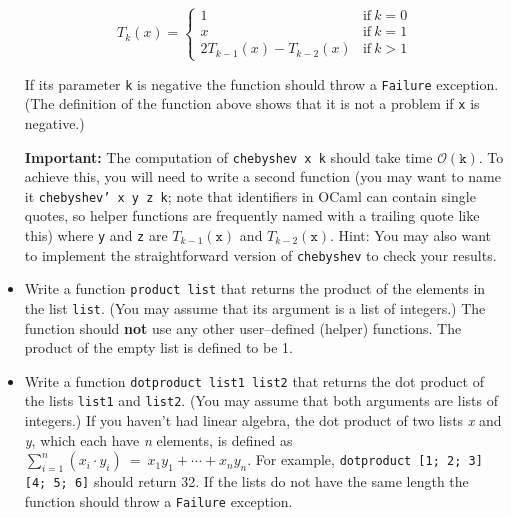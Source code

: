 \documentclass[11pt]{article}
\begin{document}
\begin{itemize}
            \vspace{-2.5mm}

            \begin{displaymath}
              T_k(x) = \left\{
              \begin{array}{ll}

                1 & \textrm{if} \ k = 0 \\

                x & \textrm{if} \ k = 1 \\

                2T_{k-1}(x) - T_{k-2}(x) & \textrm{if} \ k > 1

              \end{array}
              \right.
            \end{displaymath}

            \vspace{-2.5mm}

            If its parameter \texttt{k} is negative the function should
            throw a \texttt{Failure} exception.  (The definition of the
            function above shows that it is not a problem if \texttt{x} is
            negative.)

            \textbf{Important:} The computation of \texttt{chebyshev x k}
            should take time $\mathcal{O}(\texttt{k})$.  To achieve this,
            you will need to write a second function (you may want to name
            it \texttt{chebyshev' x y z k}; note that identifiers in OCaml
            can contain single quotes, so helper functions are frequently
            named with a trailing quote like this) where \texttt{y} and
            \texttt{z} are $T_{k-1}(\texttt{x})$ and $T_{k-2}(\texttt{x})$.
            Hint: You may also want to implement the straightforward version
            of \texttt{chebyshev} to check your results.

      \item Write a function \texttt{product list} that returns the product
            of the elements in the list \texttt{list}.  (You may assume that
            its argument is a list of integers.)  The function should
            \textbf{not} use any other user--defined (helper) functions.
            The product of the empty list is defined to be 1.

      \item Write a function \texttt{dotproduct list1 list2} that returns
            the dot product of the lists \texttt{list1} and \texttt{list2}.
            (You may assume that both arguments are lists of integers.)  If
            you haven't had linear algebra, the dot product of two lists
            \emph{x} and \emph{y}, which each have \emph{n} elements, is
            defined as $\sum_{i = 1}^{n} (x_i \cdot y_i) \: = \: x_{1}y_{1}
            + \cdots + x_{n}y_{n}$.  For example, \texttt{dotproduct [1; 2;
            3] [4; 5; 6]} should return 32.  If the lists do not have
            the same length the function should throw a \texttt{Failure}
            exception.


\end{itemize}
\end{document}
